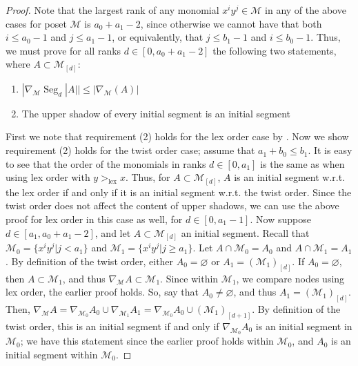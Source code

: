 \documentclass[11pt, reqno]{amsart}
\newcommand{\M}{{\mathcal M}}
\def\lex{\operatorname{lex}}
\def\Seg{\operatorname{Seg}}
\theoremstyle{plain} %
\theoremstyle{definition}
\theoremstyle{remark}
\numberwithin{equation}{section}  %
\begin{document}
\begin{proof}
Note that the largest rank of any monomial $x^iy^j \in \mathcal{M}$ in any of the above cases for poset $\mathcal{M}$ is $a_0+a_1-2$, since otherwise we cannot have that both $i \leq a_0-1$ and $j \leq a_1-1$, or equivalently, that $j \leq b_1-1$ and $i \leq b_0-1$. Thus, we must prove for all ranks $d \in [0,a_0+a_1-2]$ the following two statements, where $A \subset \mathcal{M}_{[d]}$:
\begin{enumerate}
    \item $|\nabla_{\mathcal{M}}\Seg_d|A|| \leq |\nabla_{\mathcal{M}}(A)|$
    \item The upper shadow of every initial segment is an initial segment
\end{enumerate}
First we note that requirement (2) holds for the lex order case by \cite[Proposition 2.5]{MP}. Now we show requirement (2) holds for the twist order case; assume that $a_1+b_0 \leq b_1$. It is easy to see that the order of the monomials in ranks $d \in [0,a_1]$ is the same as when using lex order with $y >_{\lex} x$. Thus, for $A \subset \mathcal{M}_{[d]}$, $A$ is an initial segment w.r.t. the lex order if and only if it is an initial segment w.r.t. the twist order. Since the twist order does not affect the content of upper shadows, we can use the above proof for lex order in this case as well, for $d\in [0,a_1-1]$. Now suppose $d\in [a_1,a_0+a_1-2]$, and let $A \subset \mathcal{M}_{[d]}$ an initial segment. Recall that $\M_0 = \{x^iy^j \vert j < a_1\}$  and $\M_1 = \{x^iy^j \vert j \geq a_1\}$. Let $A \cap \mathcal{M}_0 = A_0$ and $A \cap \mathcal{M}_1 = A_1$. By definition of the twist order, either $A_0 = \varnothing$ or $A_1 = (\mathcal{M}_{1})_{[d]}$.
If $A_0 = \varnothing$, then $A \subset \mathcal{M}_1$, and thus $\nabla_{\mathcal{M}}A \subset \mathcal{M}_1$. Since within $\mathcal{M}_1$, we compare nodes using lex order, the earlier proof holds. So, say that $A_0 \neq \varnothing$, and thus $A_1 =( \mathcal{M}_{1})_{[d]}$. Then, $\nabla_{\mathcal{M}}A= \nabla_{\mathcal{M}_0}A_0 \cup \nabla_{\mathcal{M}_1}A_1 = \nabla_{\mathcal{M}_0}A_0 \cup (\mathcal{M}_1)_{[d+1]}$. By definition of the twist order, this is an initial segment if and only if $\nabla_{\mathcal{M}_0}A_0$ is an initial segment in $\mathcal{M}_0$; we have this statement since the earlier proof holds within $\mathcal{M}_0$, and $A_0$ is an initial segment within $\mathcal{M}_0$.


\end{proof}
\end{document}
